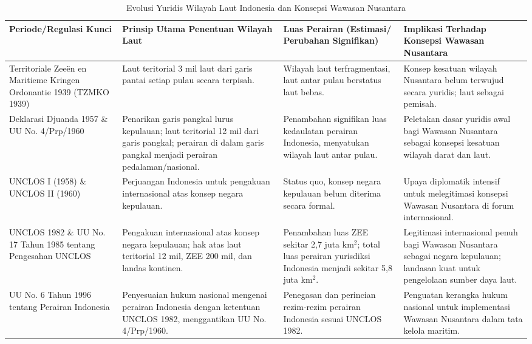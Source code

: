 \documentclass[12pt, a4paper]{article}
\begin{document}
\begin{table}[H]
\centering
\caption{Evolusi Yuridis Wilayah Laut Indonesia dan Konsepsi Wawasan Nusantara}
\label{tab:evolusi_wilayah_laut}
\begin{tabular}{|>{\RaggedRight}p{}|>{\RaggedRight}p{}|>{\RaggedRight}p{}|>{\RaggedRight}p{}|}
\hline
\textbf{Periode/Regulasi Kunci} & \textbf{Prinsip Utama Penentuan Wilayah Laut} & \textbf{Luas Perairan (Estimasi/ Perubahan Signifikan)} & \textbf{Implikasi Terhadap Konsepsi Wawasan Nusantara} \\
\hline
Territoriale Zeeën en Maritieme Kringen Ordonantie 1939 (TZMKO 1939) & Laut teritorial 3 mil laut dari garis pantai setiap pulau secara terpisah. & Wilayah laut terfragmentasi, laut antar pulau berstatus laut bebas. & Konsep kesatuan wilayah Nusantara belum terwujud secara yuridis; laut sebagai pemisah. \\
\hline
Deklarasi Djuanda 1957 \& UU No. 4/Prp/1960 & Penarikan garis pangkal lurus kepulauan; laut teritorial 12 mil dari garis pangkal; perairan di dalam garis pangkal menjadi perairan pedalaman/nasional. & Penambahan signifikan luas kedaulatan perairan Indonesia, menyatukan wilayah laut antar pulau. &Peletakan dasar yuridis awal bagi Wawasan Nusantara sebagai konsepsi kesatuan wilayah darat dan laut. \\
\hline
UNCLOS I (1958) \& UNCLOS II (1960) & Perjuangan Indonesia untuk pengakuan internasional atas konsep negara kepulauan. & Status quo, konsep negara kepulauan belum diterima secara formal. & Upaya diplomatik intensif untuk melegitimasi konsepsi Wawasan Nusantara di forum internasional. \\
\hline
UNCLOS 1982 \& UU No. 17 Tahun 1985 tentang Pengesahan UNCLOS & Pengakuan internasional atas konsep negara kepulauan; hak atas laut teritorial 12 mil, ZEE 200 mil, dan landas kontinen. & Penambahan luas ZEE sekitar 2,7 juta km$^2$; total luas perairan yurisdiksi Indonesia menjadi sekitar 5,8 juta km$^2$. & Legitimasi internasional penuh bagi Wawasan Nusantara sebagai negara kepulauan; landasan kuat untuk pengelolaan sumber daya laut. \\
\hline
UU No. 6 Tahun 1996 tentang Perairan Indonesia & Penyesuaian hukum nasional mengenai perairan Indonesia dengan ketentuan UNCLOS 1982, menggantikan UU No. 4/Prp/1960. & Penegasan dan perincian rezim-rezim perairan Indonesia sesuai UNCLOS 1982. & Penguatan kerangka hukum nasional untuk implementasi Wawasan Nusantara dalam tata kelola maritim. \\
\hline
\end{tabular}
\end{table}
\end{document}
